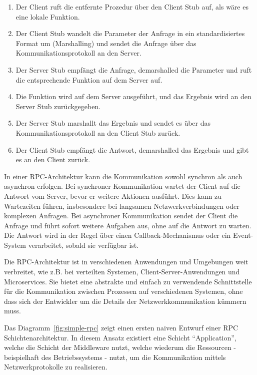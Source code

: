 \begin{enumerate} 
\item Der Client ruft die entfernte Prozedur über den Client Stub auf, als wäre es eine lokale Funktion.
\item Der Client Stub wandelt die Parameter der Anfrage in ein standardisiertes Format um (Marshalling) und sendet die Anfrage über das Kommunikationsprotokoll an den Server.
\item Der Server Stub empfängt die Anfrage, demarshalled die Parameter und ruft die entsprechende Funktion auf dem Server auf.
\item Die Funktion wird auf dem Server ausgeführt, und das Ergebnis wird an den Server Stub zurückgegeben.
\item Der Server Stub marshallt das Ergebnis und sendet es über das Kommunikationsprotokoll an den Client Stub zurück.
\item Der Client Stub empfängt die Antwort, demarshalled das Ergebnis und gibt es an den Client zurück.
\end{enumerate}

In einer RPC-Architektur kann die Kommunikation sowohl synchron als auch asynchron erfolgen. Bei synchroner Kommunikation wartet der Client auf die Antwort vom Server, bevor er weitere Aktionen ausführt. Dies kann zu Wartezeiten führen, insbesondere bei langsamen Netzwerkverbindungen oder komplexen Anfragen. Bei asynchroner Kommunikation sendet der Client die Anfrage und führt sofort weitere Aufgaben aus, ohne auf die Antwort zu warten. Die Antwort wird in der Regel über einen Callback-Mechanismus oder ein Event-System verarbeitet, sobald sie verfügbar ist.

Die RPC-Architektur ist in verschiedenen Anwendungen und Umgebungen weit verbreitet, wie z.B. bei verteilten Systemen, Client-Server-Anwendungen und Microservices. Sie bietet eine abstrakte und einfach zu verwendende Schnittstelle für die Kommunikation zwischen Prozessen auf verschiedenen Systemen, ohne dass sich der Entwickler um die Details der Netzwerkkommunikation kümmern muss.

Das Diagramm~\ref{fig:simple-rpc} zeigt einen ersten naiven Entwurf einer RPC Schichtenarchitektur. In diesem Ansatz existiert eine Schicht \enquote{Application}, welche die Schicht der Middleware nutzt, welche wiederum die Ressourcen - beispielhaft des Betriebssystems - nutzt, um die Kommunikation mittels Netzwerkprotokolle zu realisieren. 

